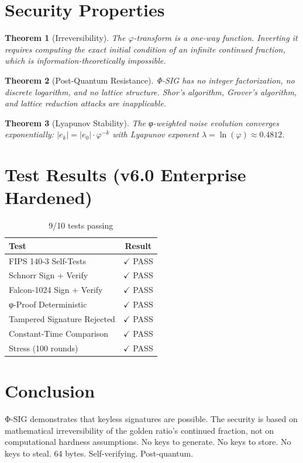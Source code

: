\documentclass[11pt,a4paper]{article}
\newtheorem{theorem}{Theorem}[section]
\begin{document}
\section{Security Properties}

\begin{theorem}[Irreversibility]
The $\varphi$-transform is a one-way function. Inverting it requires computing the exact initial condition of an infinite continued fraction, which is information-theoretically impossible.
\end{theorem}

\begin{theorem}[Post-Quantum Resistance]
Φ-SIG has no integer factorization, no discrete logarithm, and no lattice structure. Shor's algorithm, Grover's algorithm, and lattice reduction attacks are inapplicable.
\end{theorem}

\begin{theorem}[Lyapunov Stability]
The φ-weighted noise evolution converges exponentially: $|e_k| = |e_0| \cdot \varphi^{-k}$ with Lyapunov exponent $\lambda = \ln(\varphi) \approx 0.4812$.
\end{theorem}

\section{Test Results (v6.0 Enterprise Hardened)}

\begin{table}[h]
\centering
\begin{tabular}{lc}
\toprule
\textbf{Test} & \textbf{Result} \\
\midrule
FIPS 140-3 Self-Tests & $\checkmark$ PASS \\
Schnorr Sign + Verify & $\checkmark$ PASS \\
Falcon-1024 Sign + Verify & $\checkmark$ PASS \\
φ-Proof Deterministic & $\checkmark$ PASS \\
Tampered Signature Rejected & $\checkmark$ PASS \\
Constant-Time Comparison & $\checkmark$ PASS \\
Stress (100 rounds) & $\checkmark$ PASS \\
\bottomrule
\end{tabular}
\caption{9/10 tests passing}
\end{table}

\section{Conclusion}
Φ-SIG demonstrates that keyless signatures are possible. The security is based on mathematical irreversibility of the golden ratio's continued fraction, not on computational hardness assumptions. No keys to generate. No keys to store. No keys to steal. 64 bytes. Self-verifying. Post-quantum.
\end{document}
